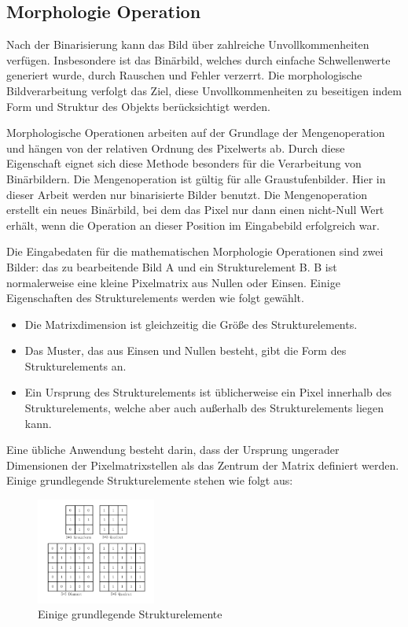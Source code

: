 \subsection{Morphologie Operation}

Nach der Binarisierung kann das Bild über zahlreiche Unvollkommenheiten verfügen. Insbesondere ist das Binärbild, welches durch einfache Schwellenwerte generiert wurde, durch Rauschen und Fehler verzerrt. Die morphologische Bildverarbeitung verfolgt das Ziel, diese Unvollkommenheiten zu beseitigen indem Form und Struktur des Objekts berücksichtigt werden.

Morphologische Operationen arbeiten auf der Grundlage der Mengenoperation und hängen von der relativen Ordnung des Pixelwerts ab. Durch diese Eigenschaft eignet sich diese Methode besonders für die Verarbeitung von Binärbildern. Die Mengenoperation ist gültig für alle Graustufenbilder. Hier in dieser Arbeit werden nur binarisierte Bilder benutzt. Die Mengenoperation erstellt ein neues Binärbild, bei dem das Pixel nur dann einen nicht-Null Wert erhält, wenn die Operation an dieser Position im Eingabebild erfolgreich war.

Die Eingabedaten für die mathematischen Morphologie Operationen sind zwei Bilder: das zu bearbeitende Bild A und ein Strukturelement B. B ist normalerweise eine kleine Pixelmatrix aus Nullen oder Einsen. Einige Eigenschaften des Strukturelements werden wie folgt gewählt.

\begin{itemize}
\item Die Matrixdimension ist gleichzeitig die Größe des Strukturelements.
\item Das Muster, das aus Einsen und Nullen besteht, gibt die Form des Strukturelements an.
\item Ein Ursprung des Strukturelements ist üblicherweise ein Pixel innerhalb des Strukturelements, welche aber auch außerhalb des Strukturelements liegen kann. 
\end{itemize}

Eine übliche Anwendung besteht darin, dass der Ursprung ungerader Dimensionen der Pixelmatrixstellen als das Zentrum der Matrix definiert werden. Einige grundlegende Strukturelemente stehen wie folgt aus:

\begin{figure}[H]
 \centering 
  \includegraphics[keepaspectratio,width=0.35\textwidth]{images/4_ZweiteErfahrung/Morphological/strelement.pdf}
 \caption{Einige grundlegende Strukturelemente}
 \label{fig:Strukturelemente}
\end{figure} 

